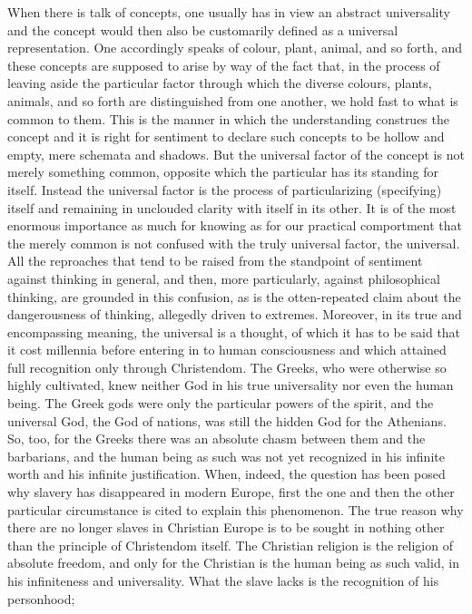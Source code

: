 When there is talk of concepts, one usually has in view an abstract
universality and the concept would then also be customarily defined as a universal
representation. One accordingly speaks of colour, plant, animal, and so forth,
and these concepts are supposed to arise by way of the fact that, in the process
of leaving aside the particular factor through which the diverse colours, plants,
animals, and so forth are distinguished from one another, we hold fast to what
is common to them. This is the manner in which the understanding construes
the concept and it is right for sentiment to declare such concepts to be
hollow and empty, mere schemata and shadows. But the universal factor of the
concept is not merely something common, opposite which the particular has its
standing for itself. Instead the universal factor is the process of particularizing
(specifying) itself and remaining in unclouded clarity with itself in its other. It
is of the most enormous importance as much for knowing as for our practical
comportment that the merely common is not confused with the truly universal
factor, the universal. All the reproaches that tend to
be raised from the standpoint of sentiment against thinking in general, and then,
more particularly, against philosophical thinking, are grounded in this confusion,
as is the otten-repeated claim about the dangerousness of thinking, allegedly driven
to extremes. Moreover, in its true and encompassing meaning, the universal is a
thought, of which it has to be said that it cost millennia before entering in to human
consciousness and which attained full recognition only through Christendom. The
Greeks, who were otherwise so highly cultivated, knew neither God in his true
universality nor even the human being. The Greek gods were only the particular
powers of the spirit, and the universal God, the God of nations, was still the
hidden God for the Athenians. So, too, for the Greeks there was an absolute
chasm between them and the barbarians, and the human being as such was not
yet recognized in his infinite worth and his infinite justification. When, indeed,
the question has been posed why slavery has disappeared in modern Europe,
first the one and then the other particular circumstance is cited to explain this
phenomenon.
The true reason why there are no longer slaves in Christian Europe
is to be sought in nothing other than the principle of Christendom itself.
The Christian religion is the religion of absolute freedom, and only for the Christian is
the human being as such valid, in his infiniteness and universality.
What the slave lacks is the recognition of his personhood;
